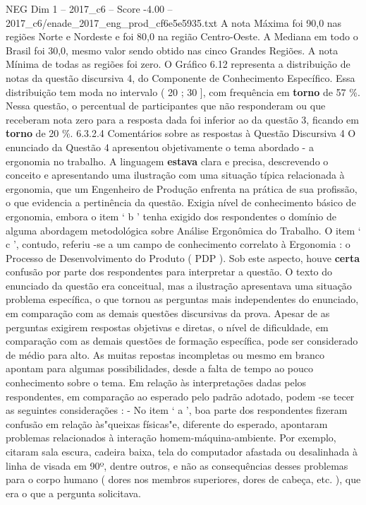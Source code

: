 \begin{textsample}{NEG Dim 1 – 2017\_c6 – Score -4.00 – 2017\_c6/enade\_2017\_eng\_prod\_cf6e5e5935.txt}
A nota Máxima foi 90,0 nas regiões Norte e Nordeste e foi 80,0 na região Centro-Oeste.
A Mediana em todo o Brasil foi 30,0, mesmo valor sendo obtido nas cinco Grandes Regiões.
A nota Mínima de todas as regiões foi zero.
O Gráfico 6.12 representa a distribuição de notas da questão discursiva 4, do Componente de Conhecimento Específico.
Essa distribuição tem moda no intervalo ( 20 ; 30 ], com frequência em \textbf{torno} de 57 \%.
Nessa questão, o percentual de participantes que não responderam ou que receberam nota zero para a resposta dada foi inferior ao da questão 3, ficando em \textbf{torno} de 20 \%. 6.3.2.4 Comentários sobre as respostas à Questão Discursiva 4 O enunciado da Questão 4 apresentou objetivamente o tema abordado - a ergonomia no trabalho.
A linguagem \textbf{estava} clara e precisa, descrevendo o conceito e apresentando uma ilustração com uma situação típica relacionada à ergonomia, que um Engenheiro de Produção enfrenta na prática de sua profissão, o que evidencia a pertinência da questão.
Exigia nível de conhecimento básico de ergonomia, embora o item ‘ b ’ tenha exigido dos respondentes o domínio de alguma abordagem metodológica sobre Análise Ergonômica do Trabalho.
O item ‘ c ’, contudo, referiu -se a um campo de conhecimento correlato à Ergonomia : o Processo de Desenvolvimento do Produto ( PDP ).
Sob este aspecto, houve \textbf{certa} confusão por parte dos respondentes para interpretar a questão.
O texto do enunciado da questão era conceitual, mas a ilustração apresentava uma situação problema específica, o que tornou as perguntas mais independentes do enunciado, em comparação com as demais questões discursivas da prova.
Apesar de as perguntas exigirem respostas objetivas e diretas, o nível de dificuldade, em comparação com as demais questões de formação específica, pode ser considerado de médio para alto.
As muitas repostas incompletas ou mesmo em branco apontam para algumas possibilidades, desde a falta de tempo ao pouco conhecimento sobre o tema.
Em relação às interpretações dadas pelos respondentes, em comparação ao esperado pelo padrão adotado, podem -se tecer as seguintes considerações : - No item ‘ a ’, boa parte dos respondentes fizeram confusão em relação às"queixas físicas"e, diferente do esperado, apontaram problemas relacionados à interação homem-máquina-ambiente.
Por exemplo, citaram sala escura, cadeira baixa, tela do computador afastada ou desalinhada à linha de visada em 90º, dentre outros, e não as consequências desses problemas para o corpo humano ( dores nos membros superiores, dores de cabeça, etc. ), que era o que a pergunta solicitava.

\end{textsample}
